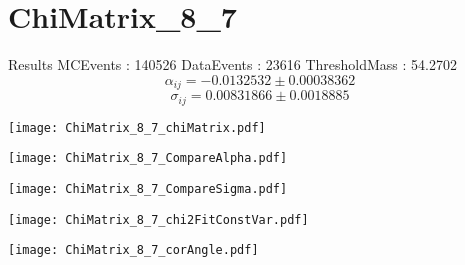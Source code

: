 \documentclass[a4paper,12pt]{article}
\begin{document}
\section{ChiMatrix\_8\_7}
\begin{minipage}{0.49\linewidth} Results \newline
MCEvents : 140526\newline
DataEvents : 23616 \newline
ThresholdMass : 54.2702\\
$$\alpha_{ij} = -0.0132532\pm 0.00038362$$
$$\sigma_{ij} = 0.00831866\pm 0.0018885$$
\end{minipage}\hfill
\begin{minipage}{0.49\linewidth} 
\texttt{[image: ChiMatrix\_8\_7\_chiMatrix.pdf]}\\
\end{minipage}
\hfill
\begin{minipage}{0.49\linewidth} 
\texttt{[image: ChiMatrix\_8\_7\_CompareAlpha.pdf]}\\
\end{minipage}
\hfill
\begin{minipage}{0.49\linewidth} 
\texttt{[image: ChiMatrix\_8\_7\_CompareSigma.pdf]}\\
\end{minipage}
\begin{minipage}{0.49\linewidth} 
\texttt{[image: ChiMatrix\_8\_7\_chi2FitConstVar.pdf]}\\
\end{minipage}
\hfill
\begin{minipage}{0.49\linewidth} 
\texttt{[image: ChiMatrix\_8\_7\_corAngle.pdf]}\\
\end{minipage}
\end{document}
